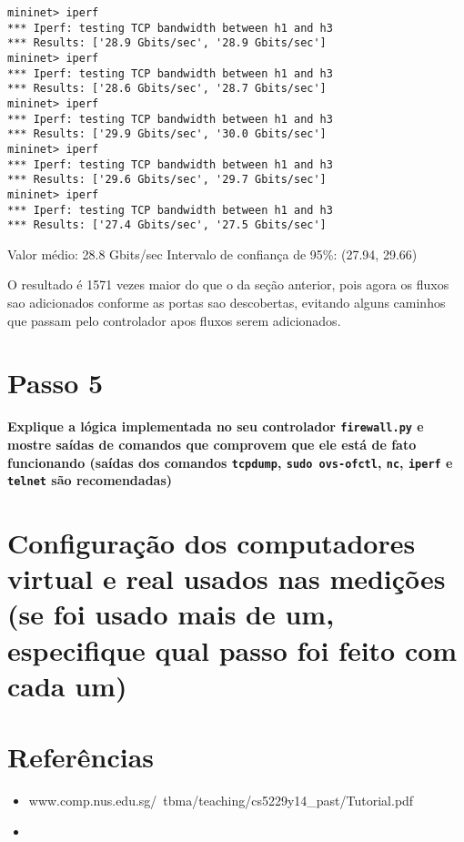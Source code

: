 \documentclass[12pt,letterpaper]{article}
\begin{document}
\begin{verbatim}
mininet> iperf 
*** Iperf: testing TCP bandwidth between h1 and h3 
*** Results: ['28.9 Gbits/sec', '28.9 Gbits/sec'] 
mininet> iperf 
*** Iperf: testing TCP bandwidth between h1 and h3 
*** Results: ['28.6 Gbits/sec', '28.7 Gbits/sec'] 
mininet> iperf 
*** Iperf: testing TCP bandwidth between h1 and h3 
*** Results: ['29.9 Gbits/sec', '30.0 Gbits/sec'] 
mininet> iperf 
*** Iperf: testing TCP bandwidth between h1 and h3 
*** Results: ['29.6 Gbits/sec', '29.7 Gbits/sec'] 
mininet> iperf 
*** Iperf: testing TCP bandwidth between h1 and h3 
*** Results: ['27.4 Gbits/sec', '27.5 Gbits/sec']
\end{verbatim}

Valor médio: 28.8 Gbits/sec
Intervalo de confiança de 95\%: (27.94, 29.66)

O resultado é 1571 vezes maior do que o da seção anterior, pois agora os fluxos sao adicionados conforme
as portas sao descobertas, evitando alguns caminhos que passam pelo controlador apos fluxos serem adicionados.

\section{Passo 5}

\textbf{Explique a lógica implementada no seu controlador
\texttt{firewall.py} e mostre saídas de comandos que comprovem que ele
está de fato funcionando (saídas dos comandos \texttt{tcpdump},
\texttt{sudo ovs-ofctl}, \texttt{nc}, \texttt{iperf} e \texttt{telnet}
são recomendadas)}

\section{Configuração dos computadores virtual e real usados nas
medições (se foi usado mais de um, especifique qual passo foi feito
com cada um)}

\section{Referências}

\begin{itemize}
   \item www.comp.nus.edu.sg/~tbma/teaching/cs5229y14_past/Tutorial.pdf
   \item
\end{itemize}
\end{document}
